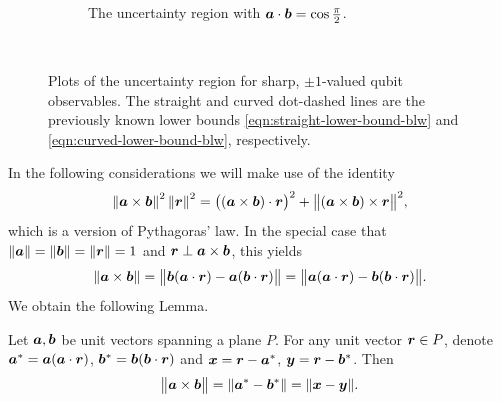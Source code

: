 \begin{figure}[H]
\begin{subfigure}[t]{0.38\textwidth}
    \caption{The uncertainty region with $\bm{a}\cdot\bm{b} = \cos\frac{\pi}{2}$.}
    \label{fig:err-region-pi-by-2}
  \end{subfigure}\\
  \caption[Plots of the uncertainty region for sharp, $\pm1$-valued qubit observables.]{Plots of the uncertainty region for sharp, $\pm1$-valued qubit observables. The straight and curved dot-dashed lines are the previously known lower bounds \eqref{eqn:straight-lower-bound-blw} and \eqref{eqn:curved-lower-bound-blw}, respectively.}
  \label{fig:top-level-err-region}
\end{figure}

In the following considerations we will make use of the identity
\begin{equation}\label{eq:r2-id}
  \left\|\bm{a}\times\bm{b}\right\|^2 \left\|\bm{r}\right\|^2 = \bigl((\bm{a}\times\bm{b})\cdot\bm{r}\bigr)^2 + \bigl\|(\bm{a}\times\bm{b})\times\bm{r}\bigr\|^2 ,
\end{equation}
which is a version of Pythagoras' law. In the special case that $\|\bm{a}\|=\|\bm{b}\|=\|\bm{r}\|=1$ and $\bm{r}\perp\bm{a}\times\bm{b}$, this yields
\begin{equation}
  \left\|\bm{a}\times\bm{b}\right\| = \bigl\|\bm{b}(\bm{a}\cdot\bm{r})-\bm{a}(\bm{b}\cdot\bm{r})\bigr\| = \bigl\|\bm{a}(\bm{a}\cdot\bm{r})-\bm{b}(\bm{b}\cdot\bm{r})\bigr\|.
\end{equation}
We obtain the following Lemma.
\begin{lem}
  Let $\bm{a},\bm{b}$ be unit vectors spanning a plane $P$. For any unit vector $\bm{r}\in P$, denote $\bm{a}^*=\bm{a}(\bm{a}\cdot\bm{r})$,  $\bm{b}^*=\bm{b}(\bm{b}\cdot\bm{r})$ and $\bm{x}=\bm{r}-\bm{a}^*$, $\bm{y}=\bm{r}-\bm{b}^*$. Then
  \begin{equation}\label{eq:axb}
    \bigl\|\bm{a}\times\bm{b}\bigr\| = \|\bm{a}^*-\bm{b}^*\|=\|\bm{x}-\bm{y}\|.
  \end{equation}
\end{lem}

